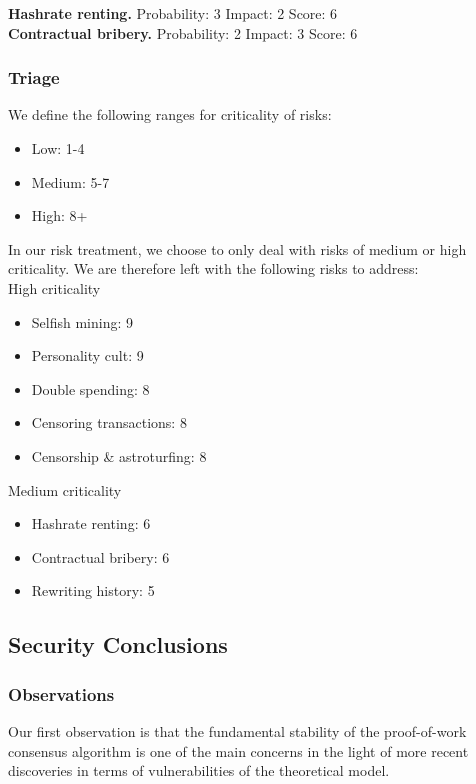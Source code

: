 \documentclass[12pt,a4paper]{article}
\begin{document}
\textbf{Hashrate renting.}
Probability: 3
Impact: 2
Score: 6\\

\textbf{Contractual bribery.}
Probability: 2
Impact: 3
Score: 6\\

\subsubsection{Triage}

We define the following ranges for criticality of risks:
\begin{itemize}
  \item Low: 1-4
  \item Medium: 5-7
  \item High: 8+
\end{itemize}

In our risk treatment, we choose to only deal with risks of medium or high criticality. We are therefore left with the following risks to address:\\

High criticality
\begin{itemize}
  \item Selfish mining: 9
  \item Personality cult: 9
  \item Double spending: 8
  \item Censoring transactions: 8
  \item Censorship \& astroturfing: 8
\end{itemize}

Medium criticality
\begin{itemize}
  \item Hashrate renting: 6
  \item Contractual bribery: 6
  \item Rewriting history: 5
\end{itemize}

\subsection{Security Conclusions}

\subsubsection{Observations}

Our first observation is that the fundamental stability of the proof-of-work consensus algorithm is one of the main concerns in the light of more recent discoveries in terms of vulnerabilities of the theoretical model.\\
\end{document}

